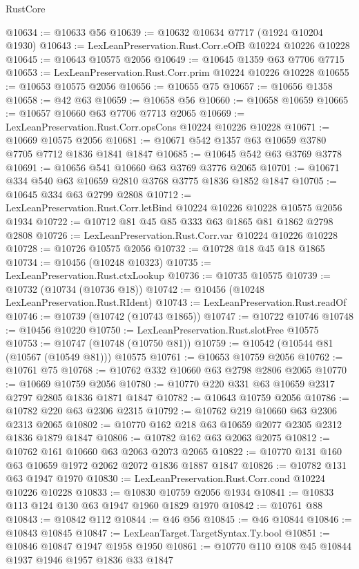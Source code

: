 \begin{lexlean}{RustCore}
\begin{coremodule}
@10634 := @10633 @56
@10639 := @10632 @10634 @7717 (@1924 @10204 @1930)
@10643 := LexLeanPreservation.Rust.Corr.eOfB @10224 @10226 @10228
@10645 := @10643 @10575 @2056
@10649 := @10645 @1359 @63 @7706 @7715
@10653 := LexLeanPreservation.Rust.Corr.prim @10224 @10226 @10228
@10655 := @10653 @10575 @2056
@10656 := @10655 @75
@10657 := @10656 @1358
@10658 := @42 @63
@10659 := @10658 @56
@10660 := @10658 @10659
@10665 := @10657 @10660 @63 @7706 @7713 @2065
@10669 := LexLeanPreservation.Rust.Corr.opsCons @10224 @10226 @10228
@10671 := @10669 @10575 @2056
@10681 := @10671 @542 @1357 @63 @10659 @3780 @7705 @7712 @1836 @1841 @1847
@10685 := @10645 @542 @63 @3769 @3778
@10691 := @10656 @541 @10660 @63 @3769 @3776 @2065
@10701 := @10671 @334 @540 @63 @10659 @2810 @3768 @3775 @1836 @1852 @1847
@10705 := @10645 @334 @63 @2799 @2808
@10712 := LexLeanPreservation.Rust.Corr.letBind @10224 @10226 @10228 @10575 @2056 @1934
@10722 := @10712 @81 @45 @85 @333 @63 @1865 @81 @1862 @2798 @2808
@10726 := LexLeanPreservation.Rust.Corr.var @10224 @10226 @10228
@10728 := @10726 @10575 @2056
@10732 := @10728 @18 @45 @18 @1865
@10734 := @10456 (@10248 @10323)
@10735 := LexLeanPreservation.Rust.ctxLookup
@10736 := @10735 @10575
@10739 := @10732 (@10734 (@10736 @18))
@10742 := @10456 (@10248 LexLeanPreservation.Rust.RIdent)
@10743 := LexLeanPreservation.Rust.readOf
@10746 := @10739 (@10742 (@10743 @1865))
@10747 := @10722 @10746
@10748 := @10456 @10220
@10750 := LexLeanPreservation.Rust.slotFree @10575
@10753 := @10747 (@10748 (@10750 @81))
@10759 := @10542 (@10544 @81 (@10567 (@10549 @81))) @10575
@10761 := @10653 @10759 @2056
@10762 := @10761 @75
@10768 := @10762 @332 @10660 @63 @2798 @2806 @2065
@10770 := @10669 @10759 @2056
@10780 := @10770 @220 @331 @63 @10659 @2317 @2797 @2805 @1836 @1871 @1847
@10782 := @10643 @10759 @2056
@10786 := @10782 @220 @63 @2306 @2315
@10792 := @10762 @219 @10660 @63 @2306 @2313 @2065
@10802 := @10770 @162 @218 @63 @10659 @2077 @2305 @2312 @1836 @1879 @1847
@10806 := @10782 @162 @63 @2063 @2075
@10812 := @10762 @161 @10660 @63 @2063 @2073 @2065
@10822 := @10770 @131 @160 @63 @10659 @1972 @2062 @2072 @1836 @1887 @1847
@10826 := @10782 @131 @63 @1947 @1970
@10830 := LexLeanPreservation.Rust.Corr.cond @10224 @10226 @10228
@10833 := @10830 @10759 @2056 @1934
@10841 := @10833 @113 @124 @130 @63 @1947 @1960 @1829 @1970
@10842 := @10761 @88
@10843 := @10842 @112
@10844 := @46 @56
@10845 := @46 @10844
@10846 := @10843 @10845
@10847 := LexLeanTarget.TargetSyntax.Ty.bool
@10851 := @10846 @10847 @1947 @1958 @1950
@10861 := @10770 @110 @108 @45 @10844 @1937 @1946 @1957 @1836 @33 @1847

\end{coremodule}
\end{lexlean}
